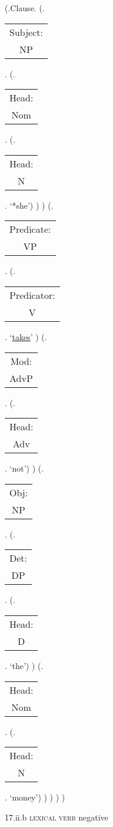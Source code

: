 \documentclass[12pt,letterpaper]{article}
\begin{document}
\begin{figure}
	\begin{center}
		\begin{parsetree}
			(.Clause.
			(.\begin{tabular}{c}Subject:\\NP\end{tabular}.  
			(.\begin{tabular}{c}Head:\\Nom\end{tabular}.
			(.\begin{tabular}{c}Head:\\N\end{tabular}. `*she')
			)
			)
			(.\begin{tabular}{c}Predicate:\\VP\end{tabular}.
			(.\begin{tabular}{c}Predicator:\\V\end{tabular}.    `\underline{takes}' )
			(.\begin{tabular}{c}Mod:\\AdvP\end{tabular}.  
			(.\begin{tabular}{c}Head:\\Adv\end{tabular}. `not')
			)
			(.\begin{tabular}{c}Obj:\\NP\end{tabular}.  
			(.\begin{tabular}{c}Det:\\DP\end{tabular}.  
			(.\begin{tabular}{c}Head:\\D\end{tabular}. `the')
			)
			(.\begin{tabular}{c}Head:\\Nom\end{tabular}.
			(.\begin{tabular}{c}Head:\\N\end{tabular}. `money')
			)
			)
			)
			) 
			
		\end{parsetree}
		\hfill \break \hfill \break
		17.ii.b \textsc{lexical verb} negative
	\end{center}
\end{figure}
\end{document}
